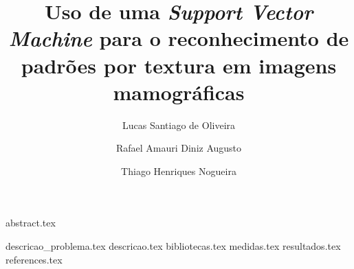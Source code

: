 \documentclass[12pt]{article}
\title{Uso de uma \emph{Support Vector Machine} para o reconhecimento de padrões por textura em imagens mamográficas}
\author{Lucas Santiago de Oliveira\inst{1}\and Rafael Amauri Diniz Augusto\inst{1}\and Thiago Henriques Nogueira\inst{1}}
\begin{document}
    \maketitle

    {abstract.tex}
    \newpage

    {descricao_problema.tex}
    {descricao.tex}
    {bibliotecas.tex}
    {medidas.tex}
    {resultados.tex}
    {references.tex}

\end{document}
